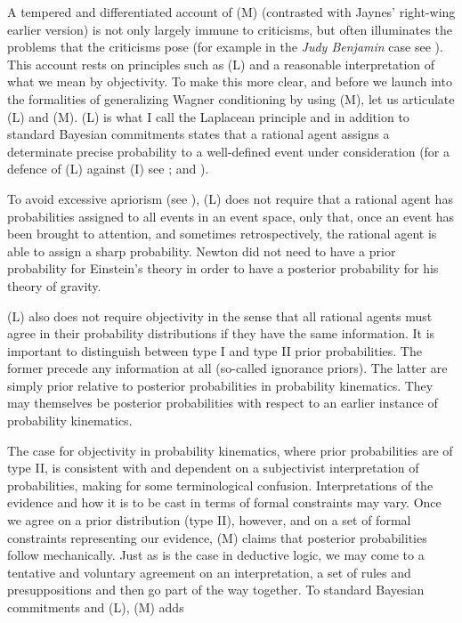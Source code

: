 A tempered and differentiated account of (M) (contrasted with Jaynes'
right-wing earlier version) is not only largely immune to criticisms,
but often illuminates the problems that the criticisms pose (for
example in the \emph{Judy Benjamin} case see ).
This account rests on principles such as (L) and a reasonable
interpretation of what we mean by objectivity. To make this more
clear, and before we launch into the formalities of generalizing
Wagner conditioning by using (M), let us articulate (L) and (M). (L)
is what I call the Laplacean principle and in addition to standard
Bayesian commitments states that a rational agent assigns a
determinate precise probability to a well-defined event under
consideration (for a defence of (L) against (I) see
; and ).

To avoid excessive apriorism (see ), (L)
does not require that a rational agent has probabilities assigned to
all events in an event space, only that, once an event has been
brought to attention, and sometimes retrospectively, the rational
agent is able to assign a sharp probability. Newton did not need to
have a prior probability for Einstein's theory in order to have a
posterior probability for his theory of gravity.

(L) also does not require objectivity in the sense that all rational
agents must agree in their probability distributions if they have the
same information. It is important to distinguish between type I and
type II prior probabilities. The former precede any information at all
(so-called ignorance priors). The latter are simply prior relative to
posterior probabilities in probability kinematics. They may themselves
be posterior probabilities with respect to an earlier instance of
probability kinematics. 

The case for objectivity in probability kinematics, where prior
probabilities are of type II, is consistent with and dependent on a
subjectivist interpretation of probabilities, making for some
terminological confusion. Interpretations of the evidence and how it
is to be cast in terms of formal constraints may vary. Once we agree
on a prior distribution (type II), however, and on a set of formal
constraints representing our evidence, (M) claims that posterior
probabilities follow mechanically. Just as is the case in deductive
logic, we may come to a tentative and voluntary agreement on an
interpretation, a set of rules and presuppositions and then go part of
the way together. To standard Bayesian commitments and (L), (M) adds

